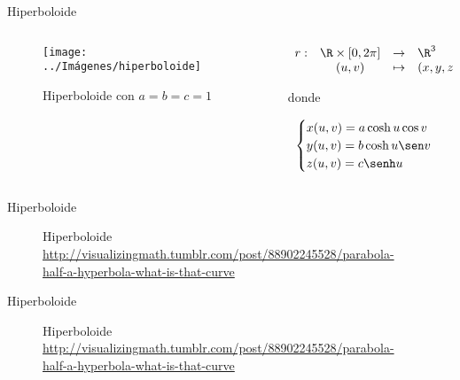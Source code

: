 \documentclass[10pt]{beamer}
\begin{document}
	\begin{frame}{Hiperboloide}
		\begin{columns}[t] %
			\begin{column}{.50\textwidth}
				\begin{figure}
					\centering
					\texttt{[image: ../Imágenes/hiperboloide]}
					\caption{Hiperboloide con $a=b=c=1$}
					\label{fig:hiperboloide}
				\end{figure}
			\end{column}%
			\hfill%
			\begin{column}{.50\textwidth}
				$$\begin{array}{rcll}
				r : & \R \times [0, 2\pi] & \to & \R^3\\
				& (u,v) & \mapsto & (x,y,z)
				\end{array}$$
				
				donde 
				
				$$ \begin{cases}
				x(u,v) = a \cosh u \cos v \\
				y(u,v) = b \cosh u \sen v \\
				z(u,v) = c \senh u
				\end{cases} $$
			\end{column}%
		\end{columns}
	\end{frame}
	
	\begin{frame}{Hiperboloide}
		\begin{figure}
			\centering
			\caption{Hiperboloide \url{http://visualizingmath.tumblr.com/post/88902245528/parabola-half-a-hyperbola-what-is-that-curve}}
			\label{fig:hiperboloide-1-gif}
		\end{figure}	
	\end{frame}
	
	\begin{frame}{Hiperboloide}
		\begin{figure}
			\centering
			\caption{Hiperboloide \url{http://visualizingmath.tumblr.com/post/88902245528/parabola-half-a-hyperbola-what-is-that-curve}}
			\label{fig:hiperboloide-2-gif}
		\end{figure}	
	\end{frame}
	
\end{document}
